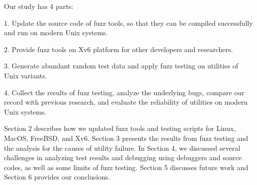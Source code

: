 
Our study has 4 parts:

1. Update the source code of fuzz tools, so that they can be compiled successfully and run on modern Unix systems.

2. Provide fuzz tools on Xv6 platform for other developers and researchers.

3. Generate abundant random test data and apply fuzz testing on utilities of Unix variants.

4. Collect the results of fuzz testing, analyze the underlying bugs, compare our record with previous research, and evaluate the reliability of utilities on modern Unix systems.



Section 2 describes how we updated fuzz tools and testing scripts for Linux, MacOS, FreeBSD, and Xv6. Section 3 presents the results from fuzz testing and the analysis for the causes of utility failure. In Section 4, we discussed several challenges in analyzing test results and debugging using debuggers and source codes, as well as some limits of fuzz testing. Section 5 discusses future work and Section 6 provides our conclusions.


